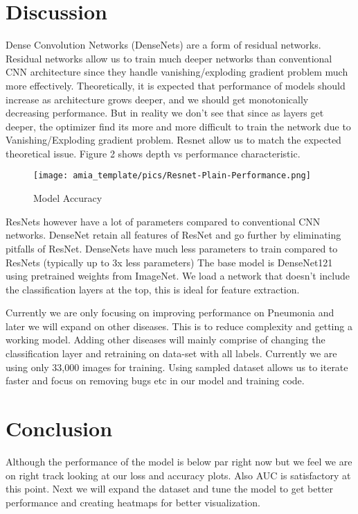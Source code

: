 \documentclass{amia}
\begin{document}
\section*{Discussion}
Dense Convolution Networks (DenseNets) are a form of residual networks. Residual networks allow us to train much deeper networks than conventional CNN architecture since they handle vanishing/exploding gradient problem much more effectively. Theoretically, it is expected that performance of models should increase as architecture grows deeper, and we should get monotonically decreasing performance. But in reality we don't see that since as layers get deeper, the optimizer find its more and more difficult to train the network due to Vanishing/Exploding gradient problem. Resnet allow us to match the expected theoretical issue. Figure 2 shows depth vs performance characteristic.

\begin{figure}[h!]
\centering
\texttt{[image: amia\_template/pics/Resnet-Plain-Performance.png]}
\caption{Model Accuracy}
\label{fig3}
\end{figure}


ResNets however have a lot of parameters compared to conventional CNN networks. DenseNet retain all features of ResNet and go further by eliminating pitfalls of ResNet. DenseNets have much less parameters to train compared to ResNets (typically up to 3x less parameters)
The base model is DenseNet121 using pretrained weights from ImageNet. We load a network that doesn't include the classification layers at the top, this is ideal for feature extraction.

Currently we are only focusing on improving performance on Pneumonia and later we will expand on other diseases. This is to reduce complexity and getting a working model. Adding other diseases will mainly comprise of changing the classification layer and retraining on data-set with all labels. Currently we are using only 33,000  images for training. Using sampled dataset allows us to iterate faster and focus on removing bugs etc in our model and training code.
\section*{Conclusion}

Although the performance of the model is below par right now but we feel we are on right track looking at our loss and accuracy plots. Also AUC is satisfactory at this point. Next we will expand the dataset and tune the model to get better performance and creating heatmaps for better visualization.
\end{document}

